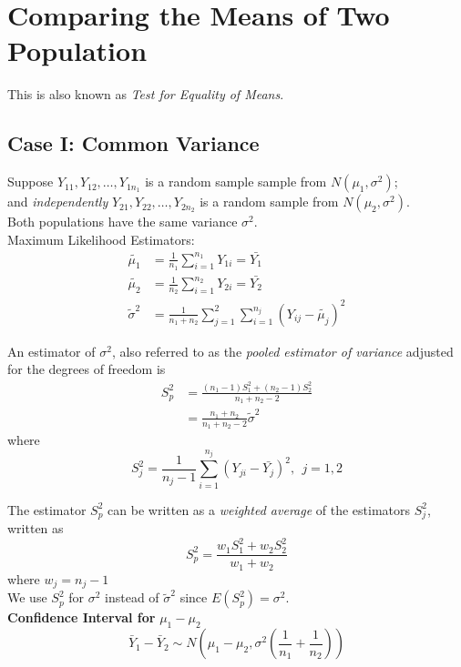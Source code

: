 \documentclass[12pt, leqno]{article}
\theoremstyle{definition}
\begin{document}
  \newpage
  \section{Comparing the Means of Two Population}
  This is also known as \emph{Test for Equality of Means}.
  \subsection{Case I: Common Variance}
  Suppose $Y_{11}, Y_{12}, \dots, Y_{1n_{1}}$ is a random sample sample from $N(\mu_{1}, \sigma^2)$; \\
  and \emph{independently} $Y_{21}, Y_{22}, \dots, Y_{2n_{2}}$ is a random sample from $N(\mu_{2}, \sigma^2)$. \\

  Both populations have the same variance $\sigma^2$. \\

  Maximum Likelihood Estimators:
  \begin{align*}
    \widetilde{\mu_{1}} &= \frac{1}{n_{1}}\sum_{i=1}^{n_{1}}Y_{1i} = \bar{Y_{1}} \\
    \widetilde{\mu_{2}} &= \frac{1}{n_{2}}\sum_{i=1}^{n_{2}}Y_{2i} = \bar{Y_{2}} \\
    \widetilde{\sigma}^{2} &=
    \frac{1}{n_{1} + n_{2}}\sum_{j=1}^{2}\sum_{i=1}^{n_{j}}(Y_{ij} - \widetilde{\mu_{j}})^{2}
  \end{align*}

  An estimator of $\sigma^2$, also referred to as the \emph{pooled estimator of variance} adjusted for the degrees of freedom is
  \begin{align*}
    S_{p}^{2} &= \frac{(n_{1} - 1)S_{1}^{2} + (n_{2} - 1)S_{2}^{2}}{n_{1} + n_{2} - 2} \\
    &= \frac{n_{1} + n_{2}}{n_{1} + n_{2} - 2}\widetilde{\sigma}^{2}
  \end{align*}
  where
  $$S_{j}^{2} = \frac{1}{n_{j} - 1}\sum_{i=1}^{n_{j}}(Y_{ji} - \bar{Y_{j}})^{2}, ~~ j = 1,2$$

  The estimator $S_{p}^{2}$ can be written as a \emph{weighted average} of the estimators $S_{j}^{2}$, written as
  $$S_{p}^{2} = \frac{w_{1}S_{1}^{2} + w_{2}S_{2}^{2}}{w_{1} + w_{2}}$$
  where $w_{j} = n_{j} - 1$ \\

  We use $S_{p}^{2}$ for $\sigma^{2}$ instead of $\widetilde{\sigma}^{2}$ since $E(S_{p}^{2}) = \sigma^2$. \\

  \textbf{Confidence Interval for} $\mu_{1} - \mu_{2}$ \\
  $$\bar{Y}_{1} - \bar{Y}_{2} \sim N\left(\mu_{1} - \mu_{2},
  \sigma^{2}\left(\frac{1}{n_{1}} + \frac{1}{n_{2}}\right)\right)$$
\end{document}
